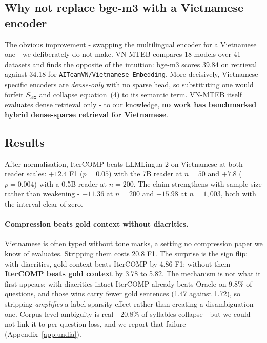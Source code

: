 \documentclass[11pt]{article}
\begin{document}
\subsection{Why not replace bge-m3 with a Vietnamese encoder}
The obvious improvement - swapping the multilingual encoder for a Vietnamese
one - we deliberately do not make. VN-MTEB \citep{pham2026vnmteb} compares 18 models
over 41 datasets and finds the opposite of the intuition: bge-m3 scores 39.84 on
retrieval against 34.18 for \texttt{AITeamVN/Vietnamese\_Embedding}. More
decisively, Vietnamese-specific encoders are \emph{dense-only} with no sparse
head, so substituting one would forfeit $S_{\text{lex}}$ and collapse
equation~(4) to its semantic term. VN-MTEB itself evaluates dense retrieval
only - to our knowledge, \textbf{no work has benchmarked hybrid dense-sparse
retrieval for Vietnamese}.

\subsection{Results}

After normalisation, IterCOMP beats LLMLingua-2 on Vietnamese at both reader
scales: $+12.4$ F1 ($p=0.05$) with the 7B reader at $n=50$ and $+7.8$
($p=0.004$) with a 0.5B reader at $n=200$. The claim strengthens with sample
size rather than weakening - $+11.36$ at $n=200$ and $+15.98$ at $n=1{,}003$,
both with the interval clear of zero.

\paragraph{Compression beats gold context without diacritics.} Vietnamese is
often typed without tone marks, a setting no compression paper we know of
evaluates.
Stripping them costs 20.8 F1. The surprise is the sign flip: with diacritics,
gold context beats IterCOMP by 4.86 F1; without them \textbf{IterCOMP beats gold
context} by 3.78 to 5.82. The mechanism is not what it first appears: with
diacritics intact IterCOMP already beats Oracle on 9.8\% of questions, and those
wins carry fewer gold sentences (1.47 against 1.72), so stripping \emph{amplifies}
a label-sparsity effect rather than creating a disambiguation one. Corpus-level
ambiguity is real - 20.8\% of syllables collapse - but we could not link it to
per-question loss, and we report that failure (Appendix~\ref{app:undia}).
\end{document}
